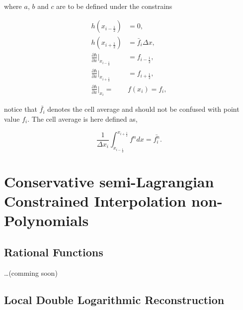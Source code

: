 \documentclass[10pt,a4paper]{article}
\newcommand{\pd}[2]{\frac{\partial #1}{\partial #2}}
\begin{document}
%
where $a$, $b$ and $c$ are to be defined under the constrains 
%
\begin{linenomath}
\begin{align}
	h(x_{i-\frac{1}{2}}) &= 0, \\
	h(x_{i+\frac{1}{2}}) &= \bar{f}_i \Delta x, \\
	\pd{h}{x}|_{x_{i-\frac{1}{2}}} &= f_{i-\frac{1}{2}}, \\
	\pd{h}{x}|_{x_{i+\frac{1}{2}}} &= f_{i+\frac{1}{2}}, \\
	\pd{h}{x}|_{x_i} = &f(x_i) = f_i, 
\end{align}
\end{linenomath}
%
notice that $\bar{f_i}$ denotes the cell average and should not be confused with point value $f_i$. The cell average is here defined as,
%
\begin{linenomath}
\begin{equation}
	\frac{1}{\Delta x_i} \int_{x_{i-\frac{1}{2}}}^{x_{i+\frac{1}{2}}} f^{n} dx = \bar{f_i^n}.
\end{equation}
\end{linenomath}

\section{Conservative semi-Lagrangian Constrained Interpolation non-Polynomials}
\label{sec:CInonP-CSL}

\subsection{Rational Functions}

\dots (comming soon)

\subsection{Local Double Logarithmic Reconstruction}
\end{document}
